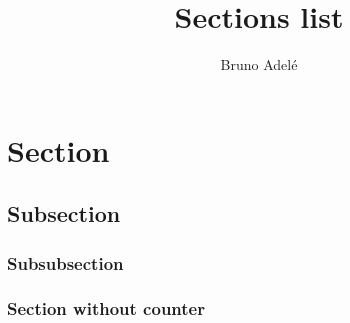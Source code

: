 \documentclass[a4paper, 12pt]{article}
\title{\Huge Sections list}
\author{Bruno Adelé}
\date{}
\begin{document}
\maketitle
\tableofcontents

\section{Section}
\lipsum[1][-2]

\subsection{Subsection}
\lipsum[2][-2]

\subsubsection{Subsubsection}
\lipsum[3][-2]

\subsubsection*{Section without counter}
\lipsum[4][-2]
\end{document}
